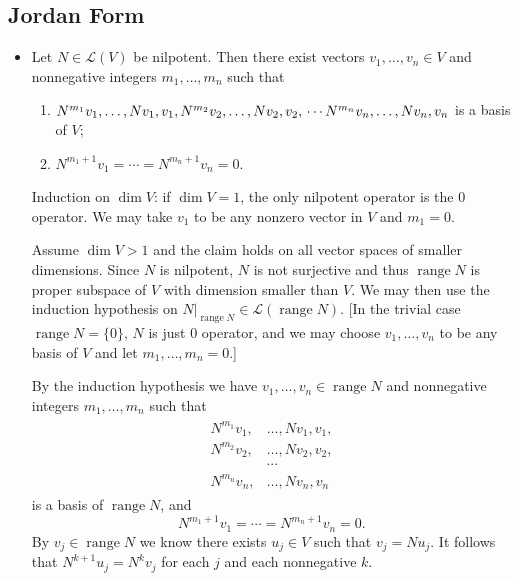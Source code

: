 \documentclass[11pt]{article}
\renewcommand{\r}{\operatorname{range}}
\renewcommand{\d}{\dim}
\newcommand{\LV}{\mathcal{L}(V)}
\begin{document}
\subsection{Jordan Form}
\begin{itemize}
    \item Let $N \in \LV$ be nilpotent. Then there exist vectors $v_1,\dots,v_n \in V$ and nonnegative integers $m_1,\dots,m_n$ such that
    \begin{enumerate}[label=(\alph*)]
        \item $N^{m_1}v_1,\dots,Nv_1,v_1, \\ N^{m_2}v_2,\dots,Nv_2,v_2, \\ \cdots \\ N^{m_n}v_n,\dots,Nv_n,v_n$ is a basis of $V$;
        \item $N^{m_1+1}v_1 = \cdots = N^{m_n+1}v_n = 0$.
    \end{enumerate}

    Induction on $\d V$: if $\d V = 1$, the only nilpotent operator is the 0 operator. We may take $v_1$ to be any nonzero vector in $V$ and $m_1 = 0$.

    Assume $\d V > 1$ and the claim holds on all vector spaces of smaller dimensions. Since $N$ is nilpotent, $N$ is not surjective and thus $\r N$ is proper subspace of $V$ with dimension smaller than $V$. We may then use the induction hypothesis on $N|_{\r N} \in \mathcal{L}(\r N)$. [In the trivial case $\r N = \{0\}$, $N$ is just 0 operator, and we may choose $v_1,\dots,v_n$ to be any basis of $V$ and let $m_1,\dots,m_n=0$.]
    
    By the induction hypothesis we have $v_1,\dots,v_n \in \r N$ and nonnegative integers $m_1,\dots,m_n$ such that \begin{align}
    \begin{split}
        N^{m_1}v_1,&\dots,Nv_1,v_1, \\ N^{m_2}v_2,&\dots,Nv_2,v_2, \\ &\cdots \\ N^{m_n}v_n,&\dots,Nv_n,v_n
    \end{split}
    \end{align} is a basis of $\r N$, and \begin{equation}
        N^{m_1+1}v_1 = \cdots = N^{m_n+1}v_n = 0.
    \end{equation} By $v_j \in \r N$ we know there exists $u_j \in V$ such that $v_j = Nu_j$. It follows that $N^{k+1}u_j = N^k v_j$ for each $j$ and each nonnegative $k$.


\end{itemize}
\end{document}
